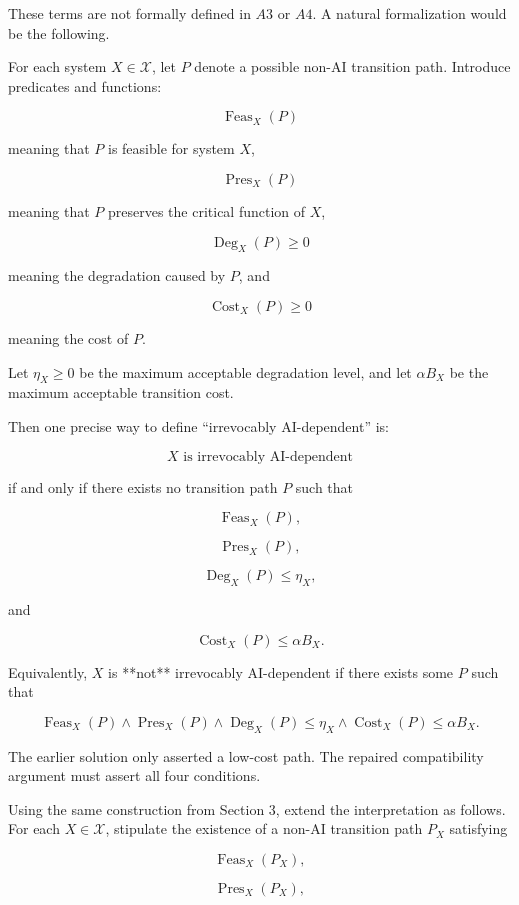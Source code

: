 These terms are not formally defined in \(A3\) or \(A4\). A natural formalization would be the following.

For each system \(X\in\mathcal X\), let \(P\) denote a possible non-AI transition path. Introduce predicates and functions:

\[
\operatorname{Feas}_X(P)
\]

meaning that \(P\) is feasible for system \(X\),

\[
\operatorname{Pres}_X(P)
\]

meaning that \(P\) preserves the critical function of \(X\),

\[
\operatorname{Deg}_X(P)\ge 0
\]

meaning the degradation caused by \(P\), and

\[
\operatorname{Cost}_X(P)\ge 0
\]

meaning the cost of \(P\).

Let \(\eta_X\ge 0\) be the maximum acceptable degradation level, and let \(\alpha B_X\) be the maximum acceptable transition cost.

Then one precise way to define “irrevocably AI-dependent” is:

\[
X\text{ is irrevocably AI-dependent}
\]

if and only if there exists no transition path \(P\) such that

\[
\operatorname{Feas}_X(P),
\]

\[
\operatorname{Pres}_X(P),
\]

\[
\operatorname{Deg}_X(P)\le \eta_X,
\]

and

\[
\operatorname{Cost}_X(P)\le \alpha B_X.
\]

Equivalently, \(X\) is **not** irrevocably AI-dependent if there exists some \(P\) such that

\[
\operatorname{Feas}_X(P)
\land
\operatorname{Pres}_X(P)
\land
\operatorname{Deg}_X(P)\le \eta_X
\land
\operatorname{Cost}_X(P)\le \alpha B_X.
\]

The earlier solution only asserted a low-cost path. The repaired compatibility argument must assert all four conditions.

Using the same construction from Section \(3\), extend the interpretation as follows. For each \(X\in\mathcal X\), stipulate the existence of a non-AI transition path \(P_X\) satisfying

\[
\operatorname{Feas}_X(P_X),
\]

\[
\operatorname{Pres}_X(P_X),
\]

